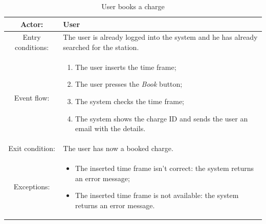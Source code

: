 \begin{table}[h]
    \begin{center}
        \begin{tabular}{|c||p{10cm}|}
            \hline
            Actor:            & User                                                                                    \\
            \hline
            Entry conditions: & The user is already logged into the system and he has already searched for the station. \\
            \hline
            Event flow:       &
            \begin{enumerate}
                \item The user inserts the time frame;
                \item The user presses the \textit{Book} button;
                \item The system checks the time frame;
                \item The system shows the charge ID and sends the user an email with the details.
            \end{enumerate}
            \\
            \hline
            Exit condition:   & The user has now a booked charge.                                                       \\
            \hline
            Exceptions:       &
            \begin{itemize}
                \item The inserted time frame isn't correct: the system returns an error message;
                \item The inserted time frame is not available: the system returns an error message.
            \end{itemize}
            \\
            \hline
        \end{tabular}
    \end{center}
    \caption{User books a charge}
\end{table}

